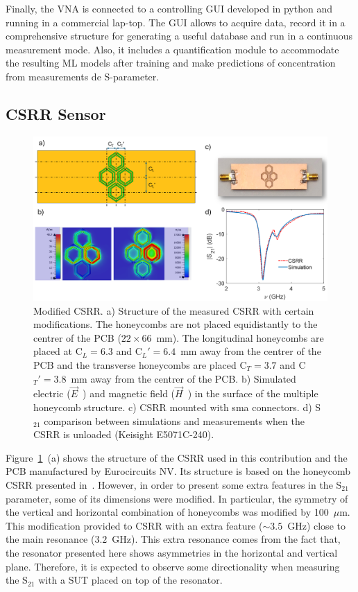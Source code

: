 \documentclass[journal,twoside,web]{ieeecolor}
\begin{document}
Finally, the VNA is connected to a controlling GUI developed in python and running in a commercial lap-top. The GUI allows to acquire data, record it in a comprehensive structure for generating a useful database and run in a continuous measurement mode. Also, it includes a quantification module to accommodate the resulting ML models after training and make predictions of concentration from measurements de S-parameter.   
\subsection{CSRR Sensor}
\label{ssec:csrrSensor}

\begin{figure}[!t]
	\centering
	\includegraphics [trim = 0mm 0mm 0mm 0mm, clip, width=1\columnwidth]{figures/fig2.png}
	\caption{Modified CSRR. a) Structure of the measured CSRR with certain modifications. The honeycombs are not placed equidistantly to the centrer of the PCB ($22\times66$~mm). The longitudinal honeycombs are placed at C$_{L}=6.3$ and C$_{L}'=6.4$~mm away from the centrer of the PCB and the transverse honeycombs are placed C$_{T}=3.7$ and C$_{T}'=3.8$~mm away from the centrer of the PCB. b) Simulated electric ($\vec{E}$~) and magnetic field ($\vec{H}$~) in the surface of the multiple honeycomb structure. c) CSRR mounted with sma connectors. d) S$_{21}$ comparison between simulations and measurements when the CSRR is unloaded (Keisight E5071C-240).}
	\label{fig:csrr}
	\vspace{-0.3cm}
\end{figure}

Figure~\ref{fig:csrr}~(a) shows the structure of the CSRR used in this contribution and the PCB manufactured by Eurocircuits NV. Its structure is based on the honeycomb CSRR presented in~\cite{Omer2020}. However, in order to present some extra features in the S$_{21}$ parameter, some of its dimensions were modified. In particular, the symmetry of the vertical and horizontal combination of honeycombs was modified by 100~$\mu$m. This modification provided to CSRR with an extra feature ($\sim3.5$~GHz) close to the main resonance ($3.2$~GHz). This extra resonance comes from the fact that, the resonator presented here shows asymmetries in the horizontal and vertical plane. Therefore, it is expected to observe some directionality when measuring the S$_{21}$ with a SUT placed on top of the resonator.
\end{document}
